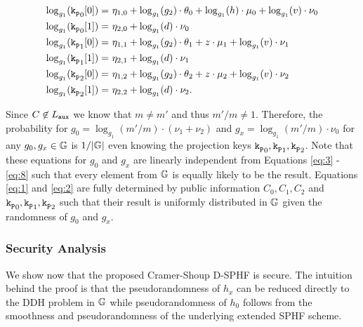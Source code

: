 \begin{align}
	\log_{g_1}(\mathtt{k_p}_0[0]) =&~ \eta_{1,0} + \log_{g_1}(g_2)\cdot\theta_{0} + \log_{g_1}(h)\cdot\mu_{0} + \log_{g_1}(v)\cdot\nu_{0} \label{eq:3}\\
	\log_{g_1}(\mathtt{k_p}_0[1]) =&~ \eta_{2,0} + \log_{g_1}(d)\cdot\nu_{0} \label{eq:4}\\
	\log_{g_1}(\mathtt{k_p}_1[0]) =&~ \eta_{1,1} + \log_{g_1}(g_2)\cdot\theta_{1} + z\cdot\mu_{1} + \log_{g_1}(v)\cdot\nu_{1} \label{eq:5}\\
	\log_{g_1}(\mathtt{k_p}_1[1]) =&~ \eta_{2,1} + \log_{g_1}(d)\cdot\nu_{1} \label{eq:6}\\
	\log_{g_1}(\mathtt{k_p}_2[0]) =&~ \eta_{1,2} + \log_{g_1}(g_2)\cdot\theta_{2} + z\cdot\mu_{2} + \log_{g_1}(v)\cdot\nu_{2} \label{eq:7}\\
	\log_{g_1}(\mathtt{k_p}_2[1]) =&~ \eta_{2,2} + \log_{g_1}(d)\cdot\nu_{2}. \label{eq:8}
\end{align}

\noindent
Since $C\not\in L_\mathtt{aux}$ we know that $m\not=m'$ and thus $m'/m\not=1$.
Therefore, the probability for $g_0=\log_{g_1}(m'/m)\cdot (\nu_1+\nu_2)$ and $g_x=\log_{g_1}(m'/m)\cdot \nu_0$ for any $g_0,g_x\in\mathbb{G}$ is $1/|\mathbb{G}|$ even knowing the projection keys $\mathtt{k_p}_0,\mathtt{k_p}_1,\mathtt{k_p}_2$.
Note that these equations for $g_0$ and $g_x$ are linearly independent from Equations \ref{eq:3} - \ref{eq:8} such that every element from $\mathbb{G}$ is equally likely to be the result.
Equations \ref{eq:1} and \ref{eq:2} are fully determined by public information $C_0,C_1,C_2$ and $\mathtt{k_p}_0,\mathtt{k_p}_1,\mathtt{k_p}_2$ such that their result is uniformly distributed in $\mathbb{G}$ given the randomness of $g_0$ and $g_x$.

\subsubsection{Security Analysis}
We show now that the proposed Cramer-Shoup \ac{D-SPHF} is secure.
The intuition behind the proof is that the pseudorandomness of $h_x$ can be reduced directly to the \ac{DDH} problem in $\mathbb{G}$ while pseudorandomness of $h_0$ follows from the smoothness and pseudorandomness of the underlying extended \ac{SPHF} scheme.

